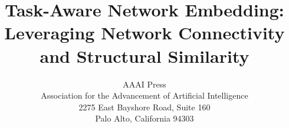 \documentclass[letterpaper]{article} %
\title{Task-Aware Network Embedding: Leveraging Network Connectivity and Structural Similarity}
\author{AAAI Press\\
	Association for the Advancement of Artificial Intelligence\\
	2275 East Bayshore Road, Suite 160\\
	Palo Alto, California 94303\\
}
\begin{document}
	
\maketitle









\pagebreak
\balance


\end{document}
